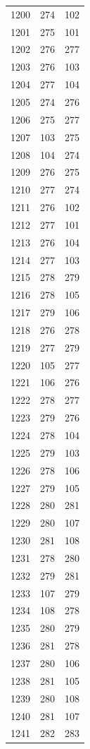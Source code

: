 \documentclass[a4paper,11pt]{article}
\begin{document}
\begin{center}
\begin{longtable}{|R{1.5cm}|R{1.5cm}|R{1.5cm}|}
 1200 &  274 &  102 \\
 1201 &  275 &  101 \\
 1202 &  276 &  277 \\
 1203 &  276 &  103 \\
 1204 &  277 &  104 \\
 1205 &  274 &  276 \\
 1206 &  275 &  277 \\
 1207 &  103 &  275 \\
 1208 &  104 &  274 \\
 1209 &  276 &  275 \\
 1210 &  277 &  274 \\
 1211 &  276 &  102 \\
 1212 &  277 &  101 \\
 1213 &  276 &  104 \\
 1214 &  277 &  103 \\
 1215 &  278 &  279 \\
 1216 &  278 &  105 \\
 1217 &  279 &  106 \\
 1218 &  276 &  278 \\
 1219 &  277 &  279 \\
 1220 &  105 &  277 \\
 1221 &  106 &  276 \\
 1222 &  278 &  277 \\
 1223 &  279 &  276 \\
 1224 &  278 &  104 \\
 1225 &  279 &  103 \\
 1226 &  278 &  106 \\
 1227 &  279 &  105 \\
 1228 &  280 &  281 \\
 1229 &  280 &  107 \\
 1230 &  281 &  108 \\
 1231 &  278 &  280 \\
 1232 &  279 &  281 \\
 1233 &  107 &  279 \\
 1234 &  108 &  278 \\
 1235 &  280 &  279 \\
 1236 &  281 &  278 \\
 1237 &  280 &  106 \\
 1238 &  281 &  105 \\
 1239 &  280 &  108 \\
 1240 &  281 &  107 \\
 1241 &  282 &  283 \\

\end{longtable}
\end{center}
\end{document}
